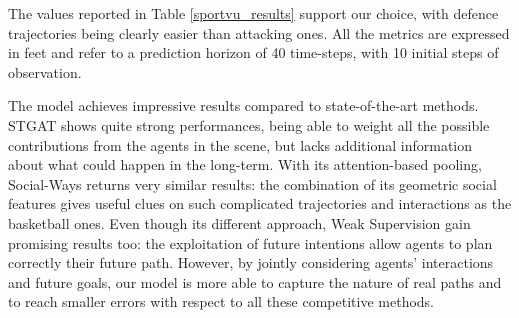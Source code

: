 \documentclass[10pt,a4paper,conference]{IEEEtran}
\begin{document}
\begin{comment}
\begin{table}[!t]
    \renewcommand{\arraystretch}{1.3}
    \centering
    \caption{Long-term evaluations}
    \label{ours_vs_cvae_long_term}
    \begin{tabular}{c|c|ccc}
        \hline
         \multirow{2}{*}{\textbf{Model}} & \multirow{2}{*}{\textbf{Team}} & \textbf{20-10 Split} & \textbf{20-20 Split} &\textbf{20-30 Split} \\
         && \textbf{ADE} &  \textbf{ADE} &  \textbf{ADE} \\
        \hline \hline
                C-VAE \cite{where_will_they_go} & ATK & 3.95 & 5.80 & 7.08 \\
                DAG-Net (Our) & ATK & \textbf{2.09} & \textbf{4.58} & \textbf{6.66} \\
        \hline
                C-VAE \cite{where_will_they_go} & DEF & 3.01 & 4.10 & \textbf{4.98} \\
                DAG-Net (Our) & DEF & \textbf{2.05} & \textbf{4.07} & 5.01 \\
        \hline
    \end{tabular}
\end{table}


\begin{table}[!t]
    \renewcommand{\arraystretch}{1.3}
    \centering
    \caption{Stanford Drone Dataset results}
    \label{sdd_results}
    \begin{tabular}{c|cc}
        \hline
        \textbf{Model} & \textbf{ADE} & \textbf{FDE}\\
        \hline \hline
             STGAT \cite{stgat} & 0.58 & 1.11\\
             Social-Ways \cite{socialways} & 0.62 & 1.16\\      
             DAG-Net (Our) & \textbf{0.54} & \textbf{1.05}\\
        \hline
    \end{tabular}
\end{table}
\end{comment}

The values reported in Table \ref{sportvu_results} support our choice, with defence trajectories being clearly easier than attacking ones. All the metrics are expressed in feet and refer to a prediction horizon of 40 time-steps, with 10 initial steps of observation. 

The model achieves impressive results compared to state-of-the-art methods. STGAT shows quite strong performances, being able to weight all the possible contributions from the agents in the scene, but lacks additional information about what could happen in the long-term. With its attention-based pooling, Social-Ways returns very similar results: the combination of its geometric social features gives useful clues on such complicated trajectories and interactions as the basketball ones. Even though its different approach, Weak Supervision gain promising results too: the exploitation of future intentions allow agents to plan correctly their future path. However, by jointly considering agents' interactions and future goals, our model is more able to capture the nature of real paths and to reach smaller errors with respect to all these competitive methods.
\end{document}
